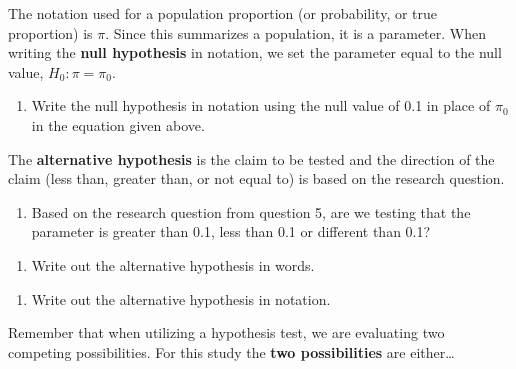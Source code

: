 \documentclass[
]{report}
\providecommand{\tightlist}{%
  \setlength{\itemsep}{0pt}\setlength{\parskip}{0pt}}
\begin{document}
\vspace{0.8in}

The notation used for a population proportion (or probability, or true proportion) is \(\pi\). Since this summarizes a population, it is a parameter. When writing the \textbf{null hypothesis} in notation, we set the parameter equal to the null value, \(H_0: \pi = \pi_0\).

\begin{enumerate}
\def\labelenumi{\arabic{enumi}.}
\setcounter{enumi}{10}
\tightlist
\item
  Write the null hypothesis in notation using the null value of 0.1 in place of \(\pi_0\) in the equation given above.
\end{enumerate}

\vspace{0.5in}

\newpage

The \textbf{alternative hypothesis} is the claim to be tested and the direction of the claim (less than, greater than, or not equal to) is based on the research question.

\begin{enumerate}
\def\labelenumi{\arabic{enumi}.}
\setcounter{enumi}{11}
\tightlist
\item
  Based on the research question from question 5, are we testing that the parameter is greater than 0.1, less than 0.1 or different than 0.1?
\end{enumerate}

\vspace{0.4in}

\begin{enumerate}
\def\labelenumi{\arabic{enumi}.}
\setcounter{enumi}{12}
\tightlist
\item
  Write out the alternative hypothesis in words.
\end{enumerate}

\vspace{1in}

\begin{enumerate}
\def\labelenumi{\arabic{enumi}.}
\setcounter{enumi}{13}
\tightlist
\item
  Write out the alternative hypothesis in notation.
\end{enumerate}

\vspace{0.5in}

Remember that when utilizing a hypothesis test, we are evaluating two competing possibilities. For this study the \textbf{two possibilities} are either\ldots{}
\end{document}
